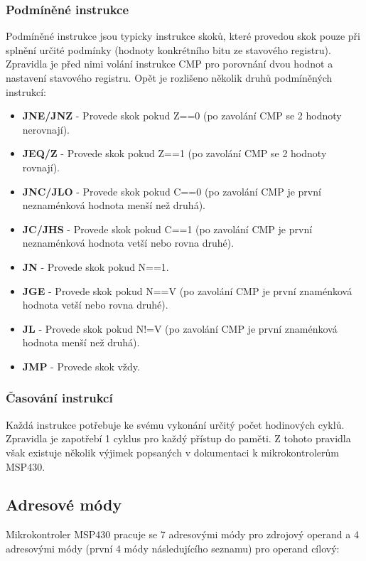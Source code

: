 \subsubsection{Podmíněné instrukce}

Podmíněné instrukce jsou typicky instrukce skoků, které provedou skok pouze při splnění určité podmínky (hodnoty konkrétního bitu ze stavového registru). Zpravidla je před nimi volání instrukce CMP pro porovnání dvou hodnot a nastavení stavového registru. Opět je rozlišeno několik druhů podmíněných instrukcí:

\begin{itemize}
\item \textbf{JNE/JNZ} - Provede skok pokud Z==0 (po zavolání CMP se 2 hodnoty nerovnají).
\item \textbf{JEQ/Z} - Provede skok pokud Z==1 (po zavolání CMP se 2 hodnoty rovnají).
\item \textbf{JNC/JLO} - Provede skok pokud C==0 (po zavolání CMP je první neznaménková hodnota menší než druhá).
\item \textbf{JC/JHS} - Provede skok pokud C==1 (po zavolání CMP je první neznaménková hodnota vetší nebo rovna druhé).
\item \textbf{JN} - Provede skok pokud N==1.
\item \textbf{JGE} - Provede skok pokud N==V (po zavolání CMP je první znaménková hodnota vetší nebo rovna druhé).
\item \textbf{JL} - Provede skok pokud N!=V (po zavolání CMP je první znaménková hodnota menší než druhá).
\item \textbf{JMP} - Provede skok vždy.
\end{itemize}

\subsubsection{Časování instrukcí}

Každá instrukce potřebuje ke svému vykonání určitý počet hodinových cyklů. Zpravidla je zapotřebí 1 cyklus pro každý přístup do paměti. Z tohoto pravidla však existuje několik výjimek popsaných v dokumentaci k mikrokontrolerům MSP430.
 
\subsection{Adresové módy}

Mikrokontroler MSP430 pracuje se 7 adresovými módy pro zdrojový operand a 4 adresovými módy (první 4 módy následujícího seznamu) pro operand cílový:

